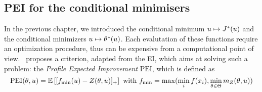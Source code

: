 \documentclass[../../Main_ManuscritThese.tex]{subfiles}
\begin{document}
\subsection{PEI for the conditional minimisers}
In the previous chapter, we introduced the conditional minimum $u\mapsto J^*(u)$ and the conditional minimizers $u \mapsto \theta^*(u)$. Each evalutation of these functions require an optimization procedure, thus can be expensive from a computational point of view.~\cite{ginsbourger_bayesian_2014} proposes a criterion, adapted from the EI, which aims at solving such a problem: the \emph{Profile Expected Improvement} $\mathrm{PEI}$, which is defined as
\begin{equation}
  \label{eq:def_PEI}
  \mathrm{PEI}(\theta, u)= \mathbb{E}\left[[f_{\min}(u) - Z(\theta, u)]_+\right] \text{ with } f_{\min} = \max(\min_i f(x_i), \min_{\theta \in \Theta} m_Z(\theta, u))
\end{equation}
\end{document}
